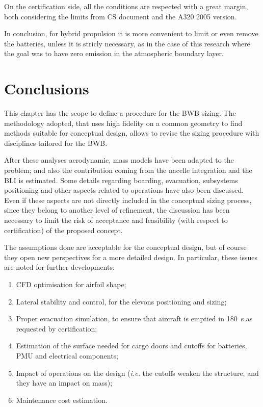 On the certification side, all the conditions are respected with a great margin, both considering the limits from CS document and the A320 2005 version. 

In conclusion, for hybrid propulsion it is more convenient to limit or even remove the batteries, unless it is stricly necessary, as in the case of this research where the goal was to have zero emission in the atmospheric boundary layer. 

\section{Conclusions}
\label{sec:chap4_conclusion}

This chapter has the scope to define a procedure for the BWB sizing. 
The methodology adopted, that uses high fidelity on a common geometry to find methods suitable for conceptual design, allows to revise the sizing procedure with disciplines tailored for the BWB. 

After these analyses aerodynamic, mass models have been adapted to the problem; and also the contribution coming from the nacelle integration and the BLI is estimated.
Some details regarding boarding, evacuation, subsystems positioning and other aspects related to operations have also been discussed. 
Even if these aspects are not directly included in the conceptual sizing process, since they belong to another level of refinement, the discussion has been necessary to limit the risk of acceptance and feasibility (with respect to certification) of the proposed concept. 

The assumptions done are acceptable for the conceptual design, but of course they open new perspectives for a more detailed design. 
In particular, these issues are noted for further developments:
\begin{enumerate}
	\item CFD optimisation for airfoil shape;
	
	\item Lateral stability and control, for the elevons positioning and sizing;
	
	\item Proper evacuation simulation, to ensure that aircraft is emptied in 180~\si{\second} as requested by certification;
	
	\item Estimation of the surface needed for cargo doors and cutoffs for batteries, PMU and electrical components;
	
	\item Impact of operations on the design (\textit{i.e.} the cutoffs weaken the structure, and they have an impact on mass);
	
	\item Maintenance cost estimation.
\end{enumerate}


